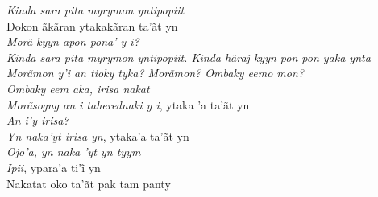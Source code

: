 \begin{linenumbers}\begingroup\raggedright

\noindent   \emph{Kinda sara pita myrymon yntipopiit}\\
  Dokon ãkãran ytakakãran ta'ãt yn\\
  \emph{Morã kyyn apon pona' y i?}\\
  \emph{Kinda sara pita myrymon yntipopiit. Kinda hãraj̃ kyyn pon pon yaka ynta}\\
  \emph{Morãmon y'i an tioky tyka? Morãmon? Ombaky eemo mon?}\\
  \emph{Ombaky eem aka, irisa nakat}\\
  \emph{Morãsogng an i taherednaki y i}, ytaka 'a ta'ãt yn\\
  \emph{An i'y irisa?}\\
  \emph{Yn naka'yt irisa yn}, ytaka'a ta'ãt yn\\
  \emph{Ojo'a, yn naka 'yt yn tyym}\\
  \emph{Ipii}, ypara’a ti’ĩ yn\\
  Nakatat oko ta'ãt pak tam panty

\end{linenumbers}\endgroup

\bigskip


